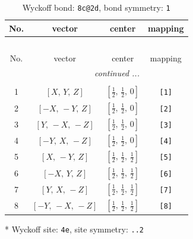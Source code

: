 \documentclass[fleqn,8pt]{jsarticle}
\begin{document}
\begin{longtable}{cccc}
\caption{Wyckoff bond: {\tt 8c@2d}, bond symmetry: {\tt 1}}
 \\
 \hline \hline
No. & vector & center & mapping \\ \hline \endfirsthead

\multicolumn{3}{l}{\tablename\ \thetable{}} \\
 \hline \hline
No. & vector & center & mapping \\ \hline \endhead

 \hline \hline
\multicolumn{3}{r}{\footnotesize\it continued ...} \\ \endfoot

 \hline \hline
\multicolumn{3}{r}{} \\ \endlastfoot

1 & $\left[ X,\, Y,\, Z \right]$ & $\left[ \frac{1}{2},\, \frac{1}{2},\, 0 \right]$ & {\tt [1]} \\ \hline
2 & $\left[ - X,\, - Y,\, Z \right]$ & $\left[ \frac{1}{2},\, \frac{1}{2},\, 0 \right]$ & {\tt [2]} \\ \hline
3 & $\left[ Y,\, - X,\, - Z \right]$ & $\left[ \frac{1}{2},\, \frac{1}{2},\, 0 \right]$ & {\tt [3]} \\ \hline
4 & $\left[ - Y,\, X,\, - Z \right]$ & $\left[ \frac{1}{2},\, \frac{1}{2},\, 0 \right]$ & {\tt [4]} \\ \hline
5 & $\left[ X,\, - Y,\, Z \right]$ & $\left[ \frac{1}{2},\, \frac{1}{2},\, \frac{1}{2} \right]$ & {\tt [5]} \\ \hline
6 & $\left[ - X,\, Y,\, Z \right]$ & $\left[ \frac{1}{2},\, \frac{1}{2},\, \frac{1}{2} \right]$ & {\tt [6]} \\ \hline
7 & $\left[ Y,\, X,\, - Z \right]$ & $\left[ \frac{1}{2},\, \frac{1}{2},\, \frac{1}{2} \right]$ & {\tt [7]} \\ \hline
8 & $\left[ - Y,\, - X,\, - Z \right]$ & $\left[ \frac{1}{2},\, \frac{1}{2},\, \frac{1}{2} \right]$ & {\tt [8]} \\
\end{longtable}
* Wyckoff site: {\tt 4e}, site symmetry: {\tt ..2}
\renewcommand{\arraystretch}{1.2}
\end{document}
